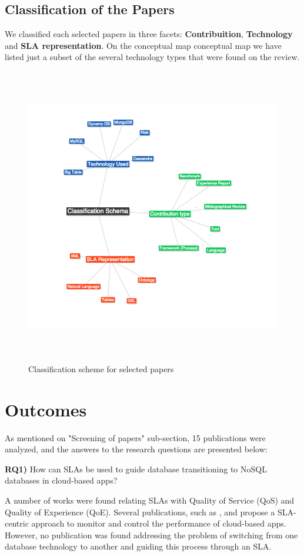\documentclass{article}
\begin{document}
\subsection{Classification of the Papers}

We classified each selected papers in three facets: \textbf{Contribuition}, \textbf{Technology} and \textbf{SLA representation}. On the conceptual map conceptual map we have listed just a subset of the several technology types that were found on the review.

\begin{figure}[!h]
\centering
\includegraphics[height=130mm]{pic2.png}
\caption{Classification scheme for selected papers \label{overflow}}
\end{figure}

\section{Outcomes}
\label{sec:outcomes}

As mentioned on "Screening of papers" sub-section, 15 publications were analyzed, and the answers to the research questions are presented below:

\textbf{RQ1)} How can SLAs be used to guide database transitioning to NoSQL databases in cloud-based apps? 

A number of works were found relating SLAs with Quality of Service (QoS) and Quality of Experience (QoE). Several publications, such as \cite{Xiong:2012:DMR:2213598.2213614}, \cite{Konstantinou:2012:TEN:2213836.2213943} and \cite{Klems:2012:RQM:2477172.2477488} propose a SLA-centric approach to monitor and control the performance of cloud-based apps. However, no publication was found addressing the problem of switching from one database technology to another and guiding this process through an SLA. 
\end{document}
